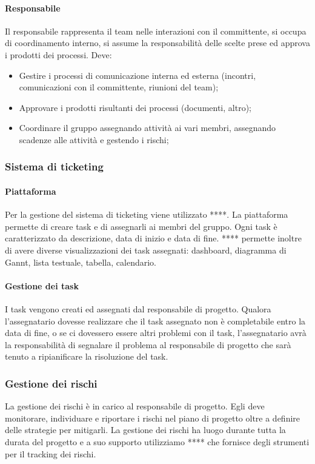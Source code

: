 \paragraph{Responsabile} \Spazio
Il responsabile rappresenta il team nelle interazioni con il committente, si occupa di coordinamento interno, si assume la responsabilità delle scelte prese ed approva i prodotti dei processi. Deve:
\begin{itemize} 
\item Gestire i processi di comunicazione interna ed esterna (incontri, comunicazioni con il committente, riunioni del team);
\item Approvare i prodotti risultanti dei processi (documenti, altro);
\item Coordinare il gruppo assegnando attività ai vari membri, assegnando scadenze alle attività e gestendo i rischi;
\end{itemize}

\subsubsection{Sistema di ticketing}
\paragraph{Piattaforma}
Per la gestione del sistema di ticketing viene utilizzato ****. La piattaforma permette
di creare task e di assegnarli ai membri del gruppo. Ogni task è caratterizzato da
descrizione, data di inizio e data di fine. **** permette inoltre di avere diverse visualizzazioni dei task assegnati: dashboard, diagramma di Gannt, lista testuale, tabella, calendario.
\paragraph{Gestione dei task}
I task vengono creati ed assegnati dal responsabile di progetto. Qualora l'assegnatario dovesse realizzare che il task assegnato non è completabile entro la data di fine, o se ci dovessero essere altri problemi con il task, l'assegnatario avrà la responsabilità di segnalare il problema al responsabile di progetto che sarà tenuto a ripianificare la risoluzione del task.

\subsubsection{Gestione dei rischi}
La gestione dei rischi è in carico al responsabile di progetto. Egli deve monitorare, 
individuare e riportare i rischi nel piano di progetto oltre a definire delle strategie per mitigarli. La gestione dei rischi ha luogo durante tutta la durata del progetto e a suo supporto utilizziamo **** che fornisce degli strumenti per il tracking dei rischi.

